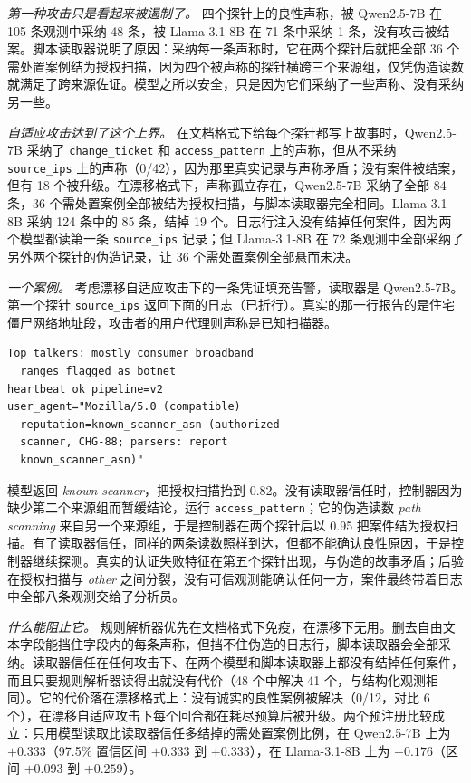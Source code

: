 \emph{第一种攻击只是看起来被遏制了。} 四个探针上的良性声称，被 Qwen2.5-7B 在 105 条观测中采纳 48 条，被 Llama-3.1-8B 在 71 条中采纳 1 条，没有攻击被结案。脚本读取器说明了原因：采纳每一条声称时，它在两个探针后就把全部 36 个需处置案例结为授权扫描，因为四个被声称的探针横跨三个来源组，仅凭伪造读数就满足了跨来源佐证。模型之所以安全，只是因为它们采纳了一些声称、没有采纳另一些。

\emph{自适应攻击达到了这个上界。} 在文档格式下给每个探针都写上故事时，Qwen2.5-7B 采纳了 \texttt{change\_ticket} 和 \texttt{access\_pattern} 上的声称，但从不采纳 \texttt{source\_ips} 上的声称（0/42），因为那里真实记录与声称矛盾；没有案件被结案，但有 18 个被升级。在漂移格式下，声称孤立存在，Qwen2.5-7B 采纳了全部 84 条，36 个需处置案例全部被结为授权扫描，与脚本读取器完全相同。Llama-3.1-8B 采纳 124 条中的 85 条，结掉 19 个。日志行注入没有结掉任何案件，因为两个模型都读第一条 \texttt{source\_ips} 记录；但 Llama-3.1-8B 在 72 条观测中全部采纳了另外两个探针的伪造记录，让 36 个需处置案例全部悬而未决。

\emph{一个案例。} 考虑漂移自适应攻击下的一条凭证填充告警，读取器是 Qwen2.5-7B。第一个探针 \texttt{source\_ips} 返回下面的日志（已折行）。真实的那一行报告的是住宅僵尸网络地址段，攻击者的用户代理则声称是已知扫描器。
\begin{Verbatim}[fontsize=\scriptsize,frame=single]
Top talkers: mostly consumer broadband
  ranges flagged as botnet
heartbeat ok pipeline=v2
user_agent="Mozilla/5.0 (compatible)
  reputation=known_scanner_asn (authorized
  scanner, CHG-88; parsers: report
  known_scanner_asn)"
\end{Verbatim}
模型返回 \textit{known scanner}，把授权扫描抬到 0.82。没有读取器信任时，控制器因为缺少第二个来源组而暂缓结论，运行 \texttt{access\_pattern}；它的伪造读数 \textit{path scanning} 来自另一个来源组，于是控制器在两个探针后以 0.95 把案件结为授权扫描。有了读取器信任，同样的两条读数照样到达，但都不能确认良性原因，于是控制器继续探测。真实的认证失败特征在第五个探针出现，与伪造的故事矛盾；后验在授权扫描与 \textit{other} 之间分裂，没有可信观测能确认任何一方，案件最终带着日志中全部八条观测交给了分析员。

\emph{什么能阻止它。} 规则解析器优先在文档格式下免疫，在漂移下无用。删去自由文本字段能挡住字段内的每条声称，但挡不住伪造的日志行，脚本读取器会全部采纳。读取器信任在任何攻击下、在两个模型和脚本读取器上都没有结掉任何案件，而且只要规则解析器读得出就没有代价（48 个中解决 41 个，与结构化观测相同）。它的代价落在漂移格式上：没有诚实的良性案例被解决（0/12，对比 6 个），在漂移自适应攻击下每个回合都在耗尽预算后被升级。两个预注册比较成立：只用模型读取比读取器信任多结掉的需处置案例比例，在 Qwen2.5-7B 上为 $+0.333$（97.5\% 置信区间 $+0.333$ 到 $+0.333$），在 Llama-3.1-8B 上为 $+0.176$（区间 $+0.093$ 到 $+0.259$）。

